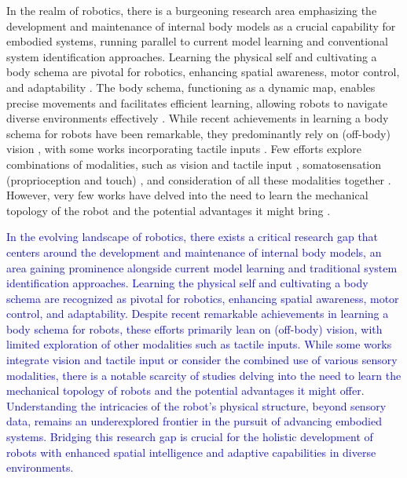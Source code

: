 \documentclass[12pt, a4paper]{article}
\begin{document}
In the realm of robotics, there is a burgeoning research area emphasizing the development and maintenance of internal body models as a crucial capability for embodied systems, running parallel to current model learning and conventional system identification approaches. Learning the physical self and cultivating a body schema are pivotal for robotics, enhancing spatial awareness, motor control, and adaptability \cite{Nguyen2021Sensorimotorrepresentationlearning}. The body schema, functioning as a dynamic map, enables precise movements and facilitates efficient learning, allowing robots to navigate diverse environments effectively \cite{Hoffmann2010Bodyschemarobotics}. While recent achievements in learning a body schema for robots have been remarkable, they predominantly rely on (off-body) vision \cite{Hersch2008Onlinelearningbody,MartinezCantin2010Bodyschemaacquisition,Hart2011roboticmodelecological,Lipson2019Taskagnosticself,Chen2022Fullybodyvisual}, with some works incorporating tactile inputs \cite{Li2015Towardsbodyschema,Zenha2018Incrementaladaptationrobot,Gama2021Goaldirectedtactile}. Few efforts explore combinations of modalities, such as vision and tactile input \cite{Fuke2007BodyImageConstructed}, somatosensation (proprioception and touch) \cite{Malinovska2022connectionistmodelassociating}, and consideration of all these modalities together \cite{Nguyen2019Reachingdevelopmentvisuo,Pugach2019BrainInspiredCoding,Lanillos2016Yieldingselfperception}. However, very few works have delved into the need to learn the mechanical topology of the robot and the potential advantages it might bring \cite{Bongard2006Automatedsynthesisbody,Bongard2006Resilientmachinescontinuous}.

\textcolor{blue}{In the evolving landscape of robotics, there exists a critical research gap that centers around the development and maintenance of internal body models, an area gaining prominence alongside current model learning and traditional system identification approaches. Learning the physical self and cultivating a body schema are recognized as pivotal for robotics, enhancing spatial awareness, motor control, and adaptability. Despite recent remarkable achievements in learning a body schema for robots, these efforts primarily lean on (off-body) vision, with limited exploration of other modalities such as tactile inputs. While some works integrate vision and tactile input or consider the combined use of various sensory modalities, there is a notable scarcity of studies delving into the need to learn the mechanical topology of robots and the potential advantages it might offer. Understanding the intricacies of the robot's physical structure, beyond sensory data, remains an underexplored frontier in the pursuit of advancing embodied systems. Bridging this research gap is crucial for the holistic development of robots with enhanced spatial intelligence and adaptive capabilities in diverse environments.}
\end{document}
